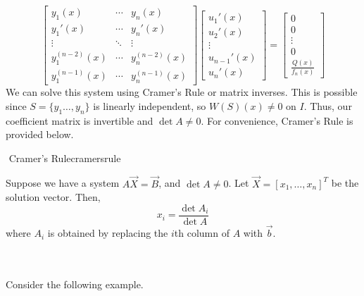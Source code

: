         \begin{equation*}
            \begin{bmatrix}
                    y_1(x) & \cdots & y_n(x) \\
                    y_1'(x) & \cdots & y_n'(x) \\
                    \vdots & \ddots & \vdots \\
                    y_1^{(n-2)}(x) & \cdots & y_n^{(n-2)}(x) \\
                    y_1^{(n-1)}(x) & \cdots & y_n^{(n-1)}(x)
            \end{bmatrix}
            \begin{bmatrix}
                u_1'(x) \\ u_2'(x) \\ \vdots \\ u_{n-1}'(x) \\ u_n'(x) 
            \end{bmatrix}
            =
            \begin{bmatrix}
                0 \\ 0 \\ \vdots \\ 0 \\ \frac{Q(x)}{f_n(x)}
            \end{bmatrix}
        \end{equation*}
        We can solve this system using Cramer's Rule or matrix inverses. This is possible since \(S=\{y_1\ldots,y_n\}\) is linearly independent, so \(W(S)(x)\neq0\) on \(I\). Thus, our coefficient matrix is invertible and \(\det A\neq0\). For convenience, Cramer's Rule is provided below.
        \begin{theorem}{\Stop\,\,Cramer's Rule}{cramersrule}

            Suppose we have a system \(A\vec{X}=\vec{B}\), and \(\det A\neq0\). Let \(\vec{X}=[x_1,\ldots,x_n]^T\) be the solution vector. Then,
            \begin{equation*}
                x_i=\frac{\det A_i}{\det A}
            \end{equation*}
            where \(A_i\) is obtained by replacing the \(i\)th column of \(A\) with \(\vec{b}\).
            
        \end{theorem}
        \pagebreak
        \vphantom
        \\
        \\
        Consider the following example.
